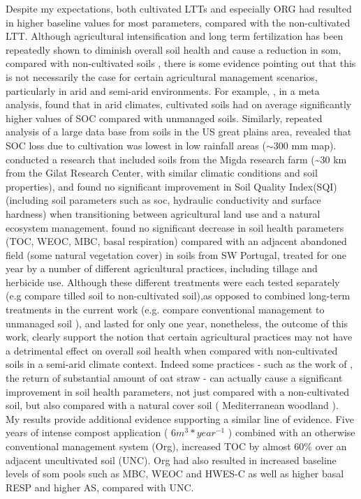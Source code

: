 	Despite my expectations, both cultivated LTTs and especially ORG had resulted in higher baseline values for most parameters, compared with the non-cultivated LTT. Although agricultural intensification and long term fertilization has been repeatedly shown to diminish overall soil health and cause a reduction in \gls{som}, compared with non-cultivated soils \citep{laurance2014, mganga2016, tilman2011}, there is some evidence pointing out that this is not necessarily the case for certain agricultural management scenarios, particularly in arid and semi-arid environments.  For example, \citet{trivedi2016}, in a meta analysis, found that in arid climates, cultivated soils had on average significantly higher values of SOC compared with unmanaged soils. Similarly, repeated analysis of a large data base from soils in the US great plains area, revealed that SOC loss due to cultivation was lowest in low rainfall areas ($ \sim $300 mm \acrshort{map})\citep{miller2004, burke1989}. \citet{paz-kagan2014} conducted a research that included soils from the Migda research farm (\~{}30 km from the Gilat Research Center, with similar climatic conditions and soil properties), and found no significant improvement in Soil Quality Index(SQI) (including soil parameters such as \gls{soc}, hydraulic conductivity and surface hardness) when transitioning between agricultural land use and a natural ecosystem management. \citet{garcia-orenes2010} found no significant decrease in soil health parameters (TOC, WEOC, MBC, basal respiration) compared with an adjacent abandoned field (some natural vegetation cover) in soils from SW Portugal, treated for one year by  a number of different agricultural practices, including tillage and herbicide use. Although these different treatments were each tested separately (e.g compare tilled soil to non-cultivated soil),as opposed to combined long-term treatments in the current work (e.g. compare conventional management to unmanaged soil ), and lasted for only one year, nonetheless, the outcome of this work, clearly support the notion that certain agricultural practices may not have a detrimental effect on overall soil health when compared with non-cultivated soils in a semi-arid climate context. Indeed some practices - such as the work of \citeauthor{garcia-orenes2010}, the return of substantial amount of oat straw - can actually cause a significant improvement in soil health parameters, not just compared with a non-cultivated soil, but also compared with a natural cover soil ( Mediterranean woodland ).\\
	My results provide additional evidence supporting a similar line of evidence. Five years of intense compost application ( $ 6 m^3*year^{-1} $ ) combined with an otherwise conventional management system (Org), increased TOC by almost 60\% over an adjacent uncultivated soil (UNC). Org had also resulted in increased baseline levels of \gls{som} pools such as MBC, WEOC  and HWES-C  as well as higher basal RESP and higher AS, compared with UNC. \\
